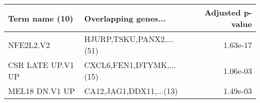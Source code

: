 \begin{tabular}{llr}
\toprule
   Term name (10) &     Overlapping genes... &  Adjusted p-value \\
\midrule
        NFE2L2.V2 & HJURP,TSKU,PANX2,...(51) &          1.63e-17 \\
CSR LATE UP.V1 UP & CXCL6,FEN1,DTYMK,...(15) &          1.06e-03 \\
   MEL18 DN.V1 UP &  CA12,JAG1,DDX11,...(13) &          1.49e-03 \\
\bottomrule
\end{tabular}
